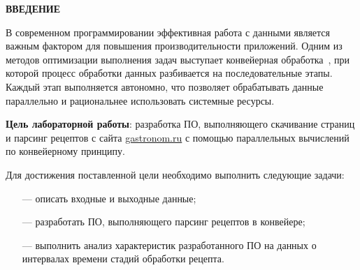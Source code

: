 \begin{center}
    \textbf{ВВЕДЕНИЕ}
\end{center}

В современном программировании эффективная работа с данными является важным фактором для повышения производительности приложений. Одним из методов оптимизации выполнения задач выступает конвейерная обработка~\cite{pipline_proc}, при которой процесс обработки данных разбивается на последовательные этапы. Каждый этап выполняется автономно, что позволяет обрабатывать данные параллельно и рациональнее использовать системные ресурсы.

\textbf{Цель лабораторной работы}: разработка ПО, выполняющего скачивание страниц и парсинг рецептов с сайта \url{gastronom.ru} с помощью параллельных вычислений по конвейерному принципу.

Для достижения поставленной цели необходимо выполнить следующие задачи:
\begin{itemize}
    \item[---] описать входные и выходные данные;
    \item[---] разработать ПО, выполняющего парсинг рецептов в конвейере;
	\item[---] выполнить анализ характеристик разработанного ПО на данных о интервалах времени стадий обработки рецепта.
\end{itemize}